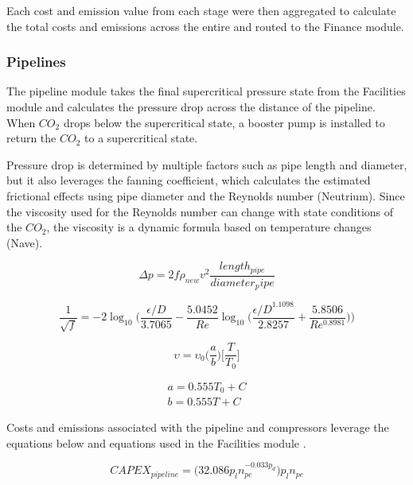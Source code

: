 \documentclass[balance,upint,subscriptcorrection,varvw,mathalfa=cal=boondoxo,spanish,french,vietnamese,russian,greek,pdf-a,colorlinks]{asmeconf}
\begin{document}
Each cost and emission value from each stage were then aggregated to calculate the total costs and emissions across the entire and routed to the Finance module.

\subsubsection{Pipelines}

The pipeline module takes the final supercritical pressure state from the Facilities module and calculates the pressure drop across the distance of the pipeline. When $CO_{2}$ drops below the supercritical state, a booster pump is installed to return the $CO_{2}$ to a supercritical state. 

Pressure drop is determined by multiple factors such as pipe length and diameter, but it also leverages the fanning coefficient, which calculates the estimated frictional effects using pipe diameter and the Reynolds number (Neutrium).  Since the viscosity used for the Reynolds number can change with state conditions of the $CO_{2}$, the viscosity is a dynamic formula based on temperature changes (Nave).

\begin{equation}
    \Delta p = 2f\rho_{new}v^2\frac{length_{pipe}}{diameter_pipe}
\end{equation}

\begin{equation}
    \frac{1}{\sqrt{f}} = -2\log_{10}\Bigg(\frac{\epsilon/D}{3.7065}-\frac{5.0452}{Re}\log_{10}\bigg(\frac{{\epsilon/D}^{1.1098}}{2.8257}+\frac{5.8506}{Re^{0.8981}}\bigg)\Bigg)
\end{equation}

\begin{equation}
    \upsilon = \upsilon_0\bigg(\frac{a}{b}\bigg)\bigg[\frac{T}{T_0}\bigg]
\end{equation}

\begin{equation}
    \begin{array}{l}
        a = 0.555T_0+C \\
        b = 0.555T+C
    \end{array}
\end{equation}

Costs and emissions associated with the pipeline and compressors leverage the equations below and equations used in the Facilities module \cite{ogden}.

\begin{equation}
    CAPEX_{pipeline} = \bigg(32.086p_ln_{pc}^{-0.033p_d}\bigg)p_l n_{pc}
\end{equation}
\end{document}
